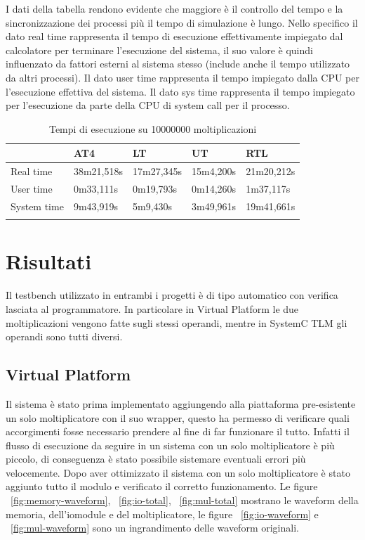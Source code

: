 \documentclass[]{IEEEtran}
\begin{document}
	I dati della tabella rendono evidente che maggiore \`e il controllo del tempo e la sincronizzazione dei processi pi\`u il tempo di simulazione \`e lungo. Nello specifico il dato real time rappresenta il tempo di esecuzione effettivamente impiegato dal calcolatore per terminare l'esecuzione del sistema, il suo valore \`e quindi influenzato da fattori esterni al sistema stesso (include anche il tempo utilizzato da altri processi). Il dato user time rappresenta il tempo impiegato dalla CPU per l'esecuzione effettiva del sistema. Il dato sys time rappresenta il tempo impiegato per l'esecuzione da parte della CPU di system call per il processo. 
	
	\begin{table}[]
		\centering
		\begin{tabular}{lllll}
			& AT4     & LT     & UT    & RTL    \\ \hline
			Real time   & 38m21,518s & 17m27,345s & 15m4,200s & 21m20,212s \\
			User time   & 0m33,111s & 0m19,793s & 0m14,260s & 1m37,117s \\
			System time & 9m43,919s & 5m9,430s & 3m49,961s & 19m41,661s \\ 
			&&&&\\
		\end{tabular}
		\caption{Tempi di esecuzione su 10000000 moltiplicazioni}
		\label{tab:time}
	\end{table}
	
	\section{Risultati}

	Il testbench utilizzato in entrambi i progetti \`e di tipo automatico con verifica lasciata al programmatore. In particolare in Virtual Platform le due moltiplicazioni vengono fatte sugli stessi operandi, mentre in SystemC TLM gli operandi sono tutti diversi.

	\subsection{Virtual Platform}
	Il sistema \`e stato prima implementato aggiungendo alla piattaforma pre-esistente un solo moltiplicatore con il suo wrapper, questo ha permesso di verificare quali accorgimenti fosse necessario prendere al fine di far funzionare il tutto. Infatti il flusso di esecuzione da seguire in un sistema con un solo moltiplicatore \`e pi\`u piccolo, di conseguenza \`e stato possibile sistemare eventuali errori pi\`u velocemente. Dopo aver ottimizzato il sistema con un solo moltiplicatore \`e stato aggiunto tutto il modulo e verificato il corretto funzionamento. Le figure ~\ref{fig:memory-waveform}, ~\ref{fig:io-total}, ~\ref{fig:mul-total} mostrano le waveform della memoria, dell'iomodule e del moltiplicatore, le figure ~\ref{fig:io-waveform} e ~\ref{fig:mul-waveform} sono un ingrandimento delle waveform originali.
\end{document}
